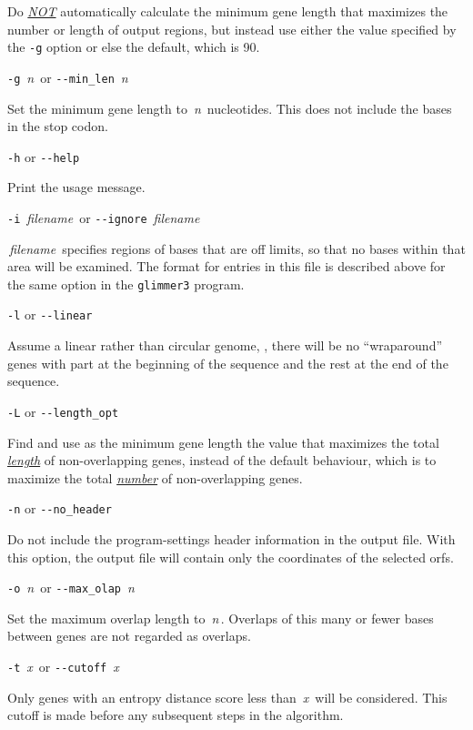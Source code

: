 \documentclass[fleqn,titlepage,11pt]{article}
\def\Desc#1{\,\mbox{\emph{#1}}\,}
\def\Pg#1{\texttt{#1}}
\begin{document}
  Do \underline{\emph{NOT}} automatically calculate the minimum gene
  length that maximizes the number or length of output regions, but
  instead use either the value specified by the \Pg{-g} option or
  else the default, which is 90.

\exdent
  \verb`-g` \Desc{n} \enskip or \enskip \verb`--min_len` \Desc{n}

  Set the minimum gene length to \Desc{n} nucleotides.  This does not include
  the bases in the stop codon.

\exdent
  \verb`-h` \enskip or \enskip \verb`--help`

  Print the usage message.

\exdent
  \verb`-i` \Desc{filename} \enskip or \enskip \verb`--ignore` \Desc{filename}

  \Desc{filename} specifies regions of bases that are off 
  limits, so that no bases within that area will be examined.
  The format for entries in this file is described above for
  the same option in the \Pg{glimmer3} program.

\exdent
  \verb`-l` \enskip or \enskip \verb`--linear`

  Assume a linear rather than circular genome, \ie, there will
  be no ``wraparound'' genes with part at the beginning of the sequence
  and the rest at the end of the sequence.

\exdent
  \verb`-L` \enskip or \enskip \verb`--length_opt`

  Find and use as the minimum gene length the value that maximizes the
  total \underline{\emph{length}} of non-overlapping genes, instead of
  the default behaviour, which is to maximize the total \underline{\emph{number}}
  of non-overlapping genes.

\exdent
  \verb`-n` \enskip or \enskip \verb`--no_header`

  Do not include the program-settings header information in the
  output file.  With this option, the output file will contain
  only the coordinates of the selected orfs.

\exdent
  \verb`-o` \Desc{n} \enskip or \enskip \verb`--max_olap` \Desc{n}

  Set the maximum overlap length to \Desc{n}.  Overlaps of this
  many or fewer bases between genes are not regarded as overlaps.

\exdent
  \verb`-t` \Desc{x} \enskip or \enskip \verb`--cutoff` \Desc{x}

  Only genes with an entropy distance score less than \Desc{x} will
  be considered.  This cutoff is made before any subsequent steps
  in the algorithm.
\end{document}
